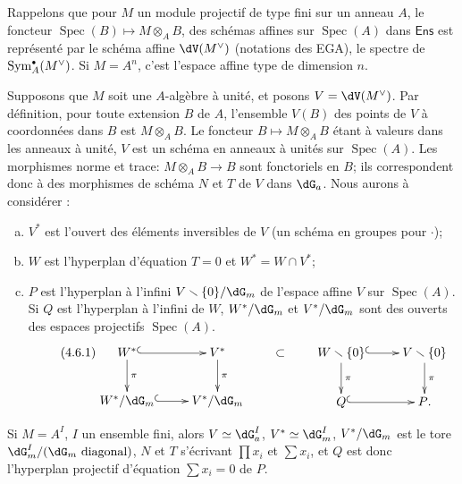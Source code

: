 \documentclass[oneside]{book}
\DeclareMathOperator{\spec}{Spec}
\renewcommand{\setminus}{\smallsetminus}
\theoremstyle{sga-source}
\theoremstyle{sga-source-dash}
\theoremstyle{sga-source-dotdash}
\theoremstyle{sga-source-number-note-dash}
\theoremstyle{sga-source-note-number-dotdash}
\theoremstyle{sga-source-example-dotdash}
\theoremstyle{sga-source-inline-number}
\theoremstyle{sga-source-bare-number}
\theoremstyle{sga-source}
\let\oldbullet\bullet
\renewcommand{\bullet}{\textnormal{\tiny$\oldbullet$}}
\begin{document}
\subsection{}\label{VI:4-6}

Rappelons que pour $M$ un module projectif de type fini sur un anneau $A$, le 
foncteur $\spec(B)\mapsto M\otimes_A B$, des schémas affines sur $\spec(A)$ 
dans $\mathsf{Ens}$ est représenté par le schéma affine $\dV(M^\vee)$ 
(notations des EGA), le spectre de $\operatorname{Sym}_A^\bullet(M^\vee)$. Si 
$M=A^n$, c'est l'espace affine type de dimension $n$. 

Supposons que $M$ soit une $A$-algèbre à unité, et posons 
$V=\dV(M^\vee)$. Par définition, pour toute extension $B$ de $A$, l'ensemble 
$V(B)$ des points de $V$ à coordonnées dans $B$ est $M\otimes_A B$. Le 
foncteur $B\mapsto M\otimes_A B$ étant à valeurs dans les anneaux à 
unité, $V$ est un schéma en anneaux à unités sur $\spec(A)$. Les 
morphismes norme et trace: $M\otimes_A B\to B$ sont fonctoriels en $B$; ils 
correspondent donc à des morphismes de schéma $N$ et $T$ de $V$ dans 
$\dG_a$. Nous aurons à considérer : 
\begin{enumerate}[a)]
  \item $V^\ast$ est l'ouvert des éléments inversibles de $V$ (un schéma 
    en groupes pour $\cdot$);
  \item $W$ est l'hyperplan d'équation $T=0$ et $W^\ast=W\cap V^\ast$; 
  \item $P$ est l'hyperplan à l'infini $V\setminus \{0\}/\dG_m$ de l'espace 
    affine $V$ sur $\spec(A)$. Si $Q$ est l'hyperplan à l'infini de $W$, 
    $W^\ast/\dG_m$ et $V^\ast/\dG_m$ sont des ouverts des espaces projectifs 
     $\spec(A)$. 
    \begin{equation*}\tag{4.6.1}\label{VI:eq:4-6-1}
    \xymatrix{
      W^\ast \ar@{^{(}->}[r] \ar[d]^-\pi 
        & V^\ast \ar[d]^-\pi \\
      W^\ast/\dG_m \ar@{^{(}->}[r] 
        & V^\ast/\dG_m 
    }\qquad\subset\qquad
    \xymatrix{
      W\setminus \{0\} \ar@{^{(}->}[r] \ar[d]^-\pi 
        & V\setminus \{0\} \ar[d]^-\pi \\
      Q \ar@{^{(}->}[r] 
        & P \text{.}
    }
    \end{equation*}
\end{enumerate}

Si $M=A^I$, $I$ un ensemble fini, alors $V\simeq \dG_a^I$, $V^\ast\simeq \dG_m^I$, 
$V^\ast/\dG_m$ est le tore $\dG_m^I/(\dG_m\text{ diagonal})$, $N$ et $T$ 
s'écrivant $\prod x_i$ et $\sum x_i$, et $Q$ est donc l'hyperplan 
projectif d'équation $\sum x_i=0$ de $P$. 
\end{document}

